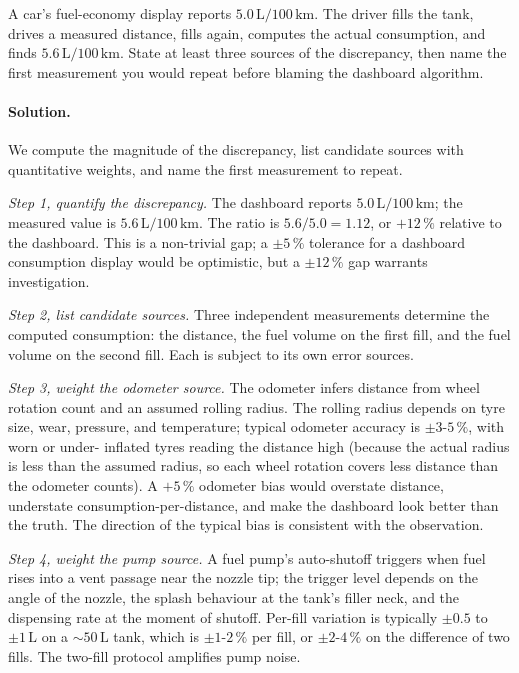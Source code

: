 \begin{exercise}
A car's fuel-economy display reports $5.0\,\text{L}/100\,\text{km}$.
The driver fills the tank, drives a measured distance, fills again,
computes the actual consumption, and finds
$5.6\,\text{L}/100\,\text{km}$. State at least three sources of the
discrepancy, then name the first measurement you would repeat before
blaming the dashboard algorithm.

\paragraph{Solution.}
We compute the magnitude of the discrepancy, list candidate sources
with quantitative weights, and name the first measurement to repeat.

\textit{Step 1, quantify the discrepancy.} The dashboard reports
$5.0 \,\text{L}/100\,\text{km}$; the measured value is
$5.6 \,\text{L}/100\,\text{km}$. The ratio is $5.6/5.0 = 1.12$, or
$+12\,\%$ relative to the dashboard. This is a non-trivial gap; a
$\pm 5\,\%$ tolerance for a dashboard consumption display would be
optimistic, but a $\pm 12\,\%$ gap warrants investigation.

\textit{Step 2, list candidate sources.} Three independent
measurements determine the computed consumption: the distance, the
fuel volume on the first fill, and the fuel volume on the second
fill. Each is subject to its own error sources.

\textit{Step 3, weight the odometer source.} The odometer infers
distance from wheel rotation count and an assumed rolling radius. The
rolling radius depends on tyre size, wear, pressure, and temperature;
typical odometer accuracy is $\pm 3$-$5\,\%$, with worn or under-
inflated tyres reading the distance high (because the actual radius
is less than the assumed radius, so each wheel rotation covers less
distance than the odometer counts). A $+5\,\%$ odometer bias would
overstate distance, understate consumption-per-distance, and make the
dashboard look better than the truth. The direction of the typical
bias is consistent with the observation.

\textit{Step 4, weight the pump source.} A fuel pump's auto-shutoff
triggers when fuel rises into a vent passage near the nozzle tip; the
trigger level depends on the angle of the nozzle, the splash
behaviour at the tank's filler neck, and the dispensing rate at the
moment of shutoff. Per-fill variation is typically $\pm 0.5$ to
$\pm 1 \,\si{\liter}$ on a $\sim 50 \,\si{\liter}$ tank, which is
$\pm 1$-$2\,\%$ per fill, or $\pm 2$-$4\,\%$ on the difference of
two fills. The two-fill protocol amplifies pump noise.


\end{exercise}
